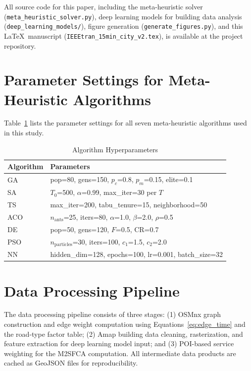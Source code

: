 \documentclass[journal]{IEEEtran}
\begin{document}
All source code for this paper, including the meta-heuristic solver (\texttt{meta\_heuristic\_solver.py}), deep learning models for building data analysis (\texttt{deep\_learning\_models/}), figure generation (\texttt{generate\_figures.py}), and this \LaTeX\ manuscript (\texttt{IEEEtran\_15min\_city\_v2.tex}), is available at the project repository.

\section{Parameter Settings for Meta-Heuristic Algorithms}

Table~\ref{tab:params} lists the parameter settings for all seven meta-heuristic algorithms used in this study.

\begin{table}[!h]
\caption{Algorithm Hyperparameters}
\label{tab:params}
\begin{center}
\begin{tabular}{ll}
\toprule
\textbf{Algorithm} & \textbf{Parameters} \\
\midrule
GA & pop=80, gens=150, $p_c$=0.8, $p_m$=0.15, elite=0.1 \\
SA & $T_0$=500, $\alpha$=0.99, max\_iter=30 per $T$ \\
TS & max\_iter=200, tabu\_tenure=15, neighborhood=50 \\
ACO & $n_{\text{ants}}$=25, iters=80, $\alpha$=1.0, $\beta$=2.0, $\rho$=0.5 \\
DE & pop=50, gens=120, $F$=0.5, CR=0.7 \\
PSO & $n_{\text{particles}}$=30, iters=100, $c_1$=1.5, $c_2$=2.0 \\
NN & hidden\_dim=128, epochs=100, lr=0.001, batch\_size=32 \\
\bottomrule
\end{tabular}
\end{center}
\end{table}

\section{Data Processing Pipeline}

The data processing pipeline consists of three stages: (1) OSMnx graph construction and edge weight computation using Equations~\ref{eq:edge_time} and the road-type factor table; (2) Amap building data cleaning, rasterization, and feature extraction for deep learning model input; and (3) POI-based service weighting for the M2SFCA computation. All intermediate data products are cached as GeoJSON files for reproducibility.
\end{document}
